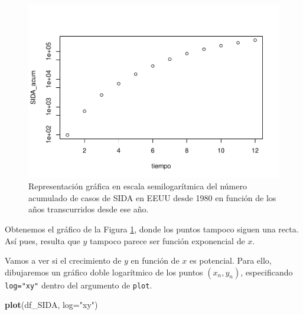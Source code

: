 \documentclass[
]{book}
\newenvironment{Shaded}{\begin{snugshade}}{\end{snugshade}}
\newcommand{\DataTypeTok}[1]{\textcolor[rgb]{0.13,0.29,0.53}{#1}}
\newcommand{\KeywordTok}[1]{\textcolor[rgb]{0.13,0.29,0.53}{\textbf{#1}}}
\newcommand{\NormalTok}[1]{#1}
\newcommand{\StringTok}[1]{\textcolor[rgb]{0.31,0.60,0.02}{#1}}
\theoremstyle{definition}
\theoremstyle{definition}
\theoremstyle{definition}
\theoremstyle{remark}
\begin{document}
\begin{figure}

{\centering \includegraphics[width=0.9\linewidth]{03chap02_Un_aperitivo_files/figure-latex/F307b-1} 

}

\caption{Representación gráfica en escala semilogarítmica  del número acumulado de casos de SIDA en EEUU desde 1980 en función de los años transcurridos desde ese año.}\label{fig:F307b}
\end{figure}

Obtenemos el gráfico de la Figura \ref{fig:F307b}, donde los puntos tampoco siguen una recta. Así pues, resulta que \(y\) tampoco parece ser función exponencial de \(x\).

Vamos a ver si el crecimiento de \(y\) en función de \(x\) es potencial. Para ello, dibujaremos un gráfico doble logarítmico de los puntos \((x_n,y_n)\), especificando \texttt{log="xy"} dentro del argumento de \texttt{plot}.

\begin{Shaded}
\begin{Highlighting}[]
\KeywordTok{plot}\NormalTok{(df\_SIDA, }\DataTypeTok{log=}\StringTok{"xy"}\NormalTok{)}
\end{Highlighting}
\end{Shaded}
\end{document}
